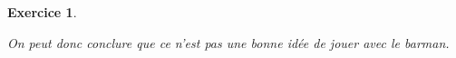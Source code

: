 \documentclass{article}
\theoremstyle{plain}
\newtheorem{exo}{Exercice}%
\begin{document}
\begin{exo}
\begin{enumerate}

      On peut donc conclure que ce n'est pas une bonne idée de jouer avec le barman.

  \end{enumerate}
\end{exo}
\end{document}
